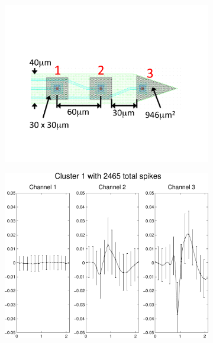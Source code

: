 \begin{center}
\begin{figure}
\begin{subfigure}[b]{.24\textwidth}
\includegraphics[width=\textwidth]{../figs/3dev}
\caption{}
\label{3dev}
\end{subfigure}
\begin{subfigure}[b]{.24\textwidth}
\includegraphics[width=\textwidth]{../figs/3devim/clus1}
\caption{}
\label{ex31}
\end{subfigure}
\begin{subfigure}[b]{.24\textwidth}

\end{subfigure}
\end{figure}
\end{center}
